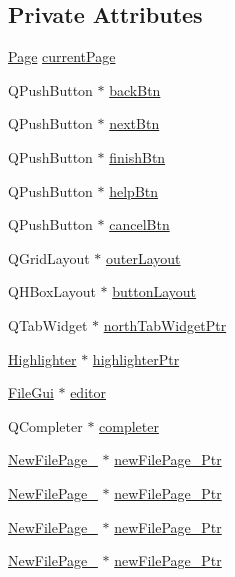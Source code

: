 \subsection*{Private Attributes}
\begin{DoxyCompactItemize}
\item 
\hyperlink{class_new_file_gui_aa420702f51dbeefc704d546f1db144ac}{Page} \hyperlink{class_new_file_gui_adaf414f47f140c24e8f08797262c646b}{current\-Page}
\item 
Q\-Push\-Button $\ast$ \hyperlink{class_new_file_gui_a795eb9a1d91260f9f99b15b8544e71e6}{back\-Btn}
\item 
Q\-Push\-Button $\ast$ \hyperlink{class_new_file_gui_ad1fa3cb3fa909bf6e71672497350f980}{next\-Btn}
\item 
Q\-Push\-Button $\ast$ \hyperlink{class_new_file_gui_a9caaf4a098bc03388235461844770705}{finish\-Btn}
\item 
Q\-Push\-Button $\ast$ \hyperlink{class_new_file_gui_a3a59cd57999cc1004a95ab2fbb3e6766}{help\-Btn}
\item 
Q\-Push\-Button $\ast$ \hyperlink{class_new_file_gui_a5be4525cfa97c2ec799a7357eb6a1fb4}{cancel\-Btn}
\item 
Q\-Grid\-Layout $\ast$ \hyperlink{class_new_file_gui_ae5aa1370799c06f4368ef636279ab259}{outer\-Layout}
\item 
Q\-H\-Box\-Layout $\ast$ \hyperlink{class_new_file_gui_aec890bfe56498ad4c1e3865387f147b5}{button\-Layout}
\item 
Q\-Tab\-Widget $\ast$ \hyperlink{class_new_file_gui_a101bfb66cbd62d340e55d632d07d7982}{north\-Tab\-Widget\-Ptr}
\item 
\hyperlink{class_highlighter}{Highlighter} $\ast$ \hyperlink{class_new_file_gui_a4a63ed16985eeb14fbe35e3197420873}{highlighter\-Ptr}
\item 
\hyperlink{class_file_gui}{File\-Gui} $\ast$ \hyperlink{class_new_file_gui_a7521ff2d2934c4a19fbef21a3a034ee9}{editor}
\item 
Q\-Completer $\ast$ \hyperlink{class_new_file_gui_a5c8508fb9dba194838e0cfce4d6f7988}{completer}
\item 
\hyperlink{class_new_file_page__1}{New\-File\-Page\-\_} $\ast$ \hyperlink{class_new_file_gui_afdeb5fdcb313e360f1479a5fd3553e4b}{new\-File\-Page\-\_\-Ptr}
\item 
\hyperlink{class_new_file_page__2}{New\-File\-Page\-\_} $\ast$ \hyperlink{class_new_file_gui_ad976d235939ccda48373c3a1ced35341}{new\-File\-Page\-\_\-Ptr}
\item 
\hyperlink{class_new_file_page__3}{New\-File\-Page\-\_} $\ast$ \hyperlink{class_new_file_gui_a2a6f8c88d96686a0e84c537bb9b77f09}{new\-File\-Page\-\_\-Ptr}
\item 
\hyperlink{class_new_file_page__4}{New\-File\-Page\-\_} $\ast$ \hyperlink{class_new_file_gui_a5b83d6fcae79fb5da3677848ec49647f}{new\-File\-Page\-\_\-Ptr}
\end{DoxyCompactItemize}


